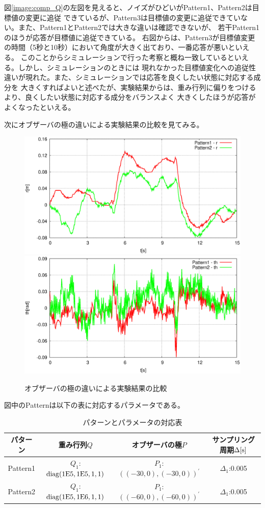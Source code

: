 	図\ref{image:comp_Q}の左図を見えると、ノイズがひどいがPattern1、Pattern2は目標値の変更に追従
	できているが、Pattern3は目標値の変更に追従できていない。また、Pattern1とPattern2では大きな違いは確認できないが、
	若干Pattern1のほうが応答が目標値に追従できている。
	右図からは、Pattern3が目標値変更の時間（5秒と10秒）において角度が大きく出ており、一番応答が悪いといえる。
	このことからシミュレーションで行った考察と概ね一致しているといえる。しかし、シミュレーションのときには
	現れなかった目標値変化への追従性違いが現れた。また、シミュレーションでは応答を良くしたい状態に対応する成分を
	大きくすればよいと述べたが、実験結果からは、重み行列に偏りをつけるより、良くしたい状態に対応する成分をバランスよく
	大きくしたほうが応答がよくなったといえる。
	\par
	次にオブザーバの極の違いによる実験結果の比較を見てみる。
	\begin{figure}[H]
		\centering
		\includegraphics[width=0.4\linewidth]{gazo/Compare_obs_R.eps}
		\includegraphics[width=0.4\linewidth]{gazo/Compare_obs_TH.eps}
		\caption{オブザーバの極の違いによる実験結果の比較}
		\label{image:comp_obs}
	\end{figure}
	図中のPatternは以下の表に対応するパラメータである。
	\begin{table}[H]
		\begin{center}
			\caption{パターンとパラメータの対応表}
			\medskip
			
			\begin{tabular}{|c|c|c|c|}\hline
				パターン & 重み行列$Q$ & オブザーバの極$P$ & サンプリング周期$\Delta[\rm{s}]$ \\ \hline\hline
				Pattern1 & $Q_1$:$\rm{diag}(1E5,1E5,1,1)$ & $P_1$:$((-30,0),(-30,0))^{'}$ & $\Delta_1$:0.005 \\ \hline
				Pattern2 & $Q_1$:$\rm{diag}(1E5,1E6,1,1)$ & $P_1$:$((-60,0),(-60,0))^{'}$ & $\Delta_1$:0.005 \\ \hline
			\end{tabular}
		\end{center}
		\label{table:huriage_control}
	\end{table}
